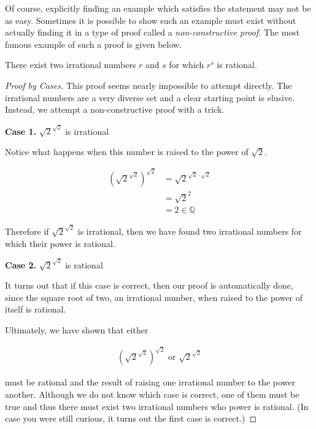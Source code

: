 \documentclass[twoside]{report}
\newcommand{\header}[2]{\begin{flushright} \textbf{#1} #2 \end{flushright}}
\begin{document}
Of course, explicitly finding an example which satisfies the statement may not be as easy. Sometimes it is possible to show such an example must exist without actually finding it in a type of proof called a \emph{non-constructive proof}. The most famous example of such a proof is given below.

\vspace{\baselineskip}
\begin{theorem}
	There exist two irrational numbers $r$ and $s$ for which $r^s$ is rational.
\end{theorem}

\begin{proof}[Proof by Cases]
	This proof seems nearly impossible to attempt directly. The irrational numbers are a very diverse set and a clear starting point is elusive. Instead, we attempt a non-constructive proof with a trick.
	
	\header{Case 1. }{$\sqrt{2}^{\sqrt{2}}$ is irrational}
	Notice what happens when this number is raised to the power of $\sqrt{2}$.
	
	\begin{align*}
		\left( \sqrt{2}^{\sqrt{2}} \right)^{\sqrt{2}} &= \sqrt{2}^{\sqrt{2} \cdot \sqrt{2}} \\
		&= \sqrt{2}^2 \\
		&= 2 \in \mathbb{Q}
	\end{align*}
	
	Therefore if $\sqrt{2}^{\sqrt{2}}$ is irrational, then we have found two irrational numbers for which their power is rational.
	
	\header{Case 2. }{$\sqrt{2}^{\sqrt{2}}$ is rational}
	
	It turns out that if this case is correct, then our proof is automatically done, since the square root of two, an irrational number, when raised to the power of itself is rational.
	
	Ultimately, we have shown that either
	
	\begin{align*}
		\left( \sqrt{2}^{\sqrt{2}} \right)^{\sqrt{2}} \text{ or } \sqrt{2}^{\sqrt{2}}
	\end{align*}
	
	must be rational and the result of raising one irrational number to the power another. Although we do not know which case is correct, one of them must be true and thus there must exist two irrational numbers who power is rational. (In case you were still curious, it turns out the first case is correct.)
\end{proof}
\vspace{\baselineskip}
\end{document}
